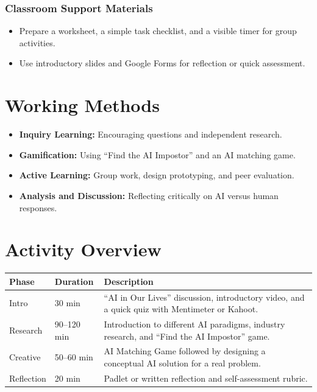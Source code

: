 \documentclass[11pt, a4paper]{article}
\begin{document}
\subsubsection*{Classroom Support Materials}
\begin{itemize}
    \item Prepare a worksheet, a simple task checklist, and a visible timer for group activities.
    \item Use introductory slides and Google Forms for reflection or quick assessment.
\end{itemize}

\section{Working Methods}
\begin{itemize}
    \item \textbf{Inquiry Learning:} Encouraging questions and independent research.
    \item \textbf{Gamification:} Using ``Find the AI Impostor'' and an AI matching game.
    \item \textbf{Active Learning:} Group work, design prototyping, and peer evaluation.
    \item \textbf{Analysis and Discussion:} Reflecting critically on AI versus human responses.
\end{itemize}

\section*{Activity Overview}
\begingroup
\small
\begin{tabularx}{\textwidth}{|l|l|L|}
    \hline
     \textbf{Phase} & \textbf{Duration} & \textbf{Description} \\ \hline
    Intro & 30 min & ``AI in Our Lives'' discussion, introductory video, and a quick quiz with Mentimeter or Kahoot. \\ \hline
    Research & 90--120 min & Introduction to different AI paradigms, industry research, and ``Find the AI Impostor'' game. \\ \hline
    Creative & 50--60 min & AI Matching Game followed by designing a conceptual AI solution for a real problem. \\ \hline
    Reflection & 20 min & Padlet or written reflection and self-assessment rubric. \\ \hline
\end{tabularx}
\endgroup
\end{document}
